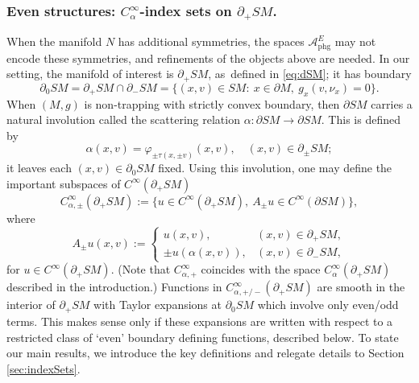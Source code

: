 \documentclass[11pt]{article}
\theoremstyle{plain}
\theoremstyle{definition}
\theoremstyle{remark}
\def\A{\mathcal{A}}
\newcommand{\phg}{\mathrm{phg}}
\begin{document}
\subsubsection*{Even structures: $C_\alpha^\infty$-index sets on $\partial_+ SM$.} When the manifold $N$ has additional symmetries, the spaces $\A_{\phg}^E$
may not encode these symmetries, and refinements of the objects above are needed. In our setting, the manifold of interest is $\partial_+ SM$,
as~defined in \eqref{eq:dSM}; it has boundary
\begin{equation*}
\partial_0 SM = \partial_+ SM\cap \partial_- SM = \{(x,v)\in SM:\ x\in \partial M,\ g_x(v,\nu_x) = 0\}.
\end{equation*}
When $(M,g)$ is non-trapping with strictly convex boundary, then $\partial SM$ carries a natural involution called the scattering relation
$\alpha\colon \partial SM\to \partial SM$. This is defined by
\begin{equation*}
\alpha(x,v) = \varphi_{\pm \tau(x,\pm v)} (x,v), \quad (x,v) \in \partial_\pm SM;
\end{equation*}
it leaves each $(x,v)\in \partial_0 SM$ fixed. Using this involution, one may define the important subspaces of $C^\infty(\partial_+ SM)$
\begin{equation}
C_{\alpha,\pm}^\infty (\partial_+ SM) := \{u\in C^\infty(\partial_+ SM),\ A_\pm u \in C^\infty(\partial SM)\},
\label{eq:Cpm}
\end{equation}
where
\begin{equation*}
A_\pm u(x,v) := 
\begin{cases}
u(x,v), & (x,v)\in \partial_+ SM, \\
\pm u(\alpha(x,v)), & (x,v)\in \partial_- SM,
\end{cases}
\end{equation*}
for $u\in C^\infty(\partial_+ SM)$.
(Note that $C_{\alpha,+}^\infty$ coincides with the space $C_\alpha^\infty(\partial_+ SM)$ described in the introduction.)
Functions in $C_{\alpha,+/-}^\infty (\partial_+ SM)$ are smooth in the interior of $\partial_+ SM$ with Taylor expansions at $\partial_0 SM$ which
involve only even/odd terms. This makes sense only if these expansions are written with respect to a restricted class of `even' boundary defining functions,
described below. To state our main results, we introduce the key definitions and relegate details to Section \ref{sec:indexSets}.
\end{document}
